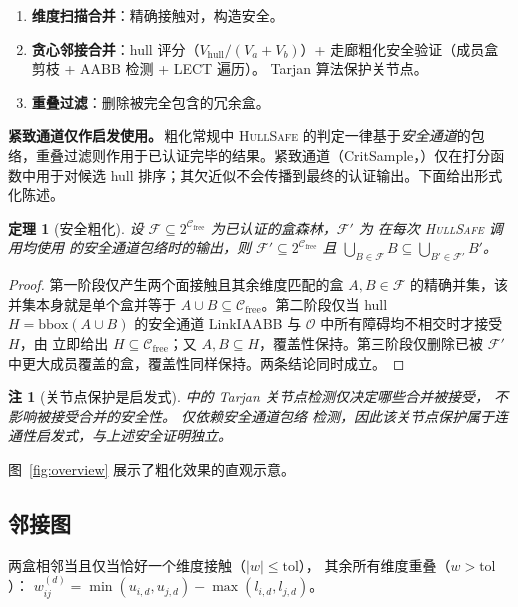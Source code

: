 \documentclass[journal]{IEEEtran}
\newtheorem{theorem}{定理}
\newtheorem{remark}{注}
\newcommand{\Cfree}{\mathcal{C}_{\mathrm{free}}}
\newcommand{\calO}{\mathcal{O}}
\begin{document}
\begin{enumerate}[nosep]
  \item \textbf{维度扫描合并}：精确接触对，构造安全。
  \item \textbf{贪心邻接合并}：hull 评分（$V_\text{hull}/(V_a+V_b)$）+
    走廊粗化安全验证（成员盒剪枝 + AABB 检测 + LECT 遍历）。
    Tarjan 算法保护关节点。
  \item \textbf{重叠过滤}：删除被完全包含的冗余盒。
\end{enumerate}

\textbf{紧致通道仅作启发使用。}\,粗化常规中 \textsc{HullSafe} 的判定一律基于\emph{安全通道}的包络，重叠过滤则作用于已认证完毕的结果。紧致通道（CritSample，）仅在打分函数中用于对候选 hull 排序；其欠近似不会传播到最终的认证输出。下面给出形式化陈述。

\begin{theorem}[安全粗化]\label{thm:coarsen_safe}
设 $\mathcal{F}\subseteq 2^{\Cfree}$ 为已认证的盒森林，$\mathcal{F}'$ 为  在每次 \textsc{HullSafe} 调用均使用  的安全通道包络时的输出，则 $\mathcal{F}'\subseteq 2^{\Cfree}$ 且 $\bigcup_{B\in\mathcal{F}}B \subseteq \bigcup_{B'\in\mathcal{F}'}B'$。
\end{theorem}

\begin{proof}
第一阶段仅产生两个面接触且其余维度匹配的盒 $A,B\in\mathcal{F}$ 的精确并集，该并集本身就是单个盒并等于 $A\cup B\subseteq\Cfree$。第二阶段仅当 hull $H=\mathrm{bbox}(A\cup B)$ 的安全通道 LinkIAABB 与 $\calO$ 中所有障碍均不相交时才接受 $H$，由  立即给出 $H\subseteq\Cfree$；又 $A,B\subseteq H$，覆盖性保持。第三阶段仅删除已被 $\mathcal{F}'$ 中更大成员覆盖的盒，覆盖性同样保持。两条结论同时成立。
\end{proof}

\begin{remark}[关节点保护是启发式]\label{rem:tarjan_heuristic}
 中的 Tarjan 关节点检测仅决定\emph{哪些}合并被接受，
不影响被接受合并的安全性。 仅依赖安全通道包络
检测，因此该关节点保护属于连通性启发式，与上述安全证明独立。
\end{remark}

图~\ref{fig:overview} 展示了粗化效果的直观示意。

\subsection{邻接图}

两盒相邻当且仅当恰好一个维度接触（$|w| \leq \text{tol}$），
其余所有维度重叠（$w > \text{tol}$）：
$w_{ij}^{(d)} = \min(u_{i,d}, u_{j,d}) - \max(l_{i,d}, l_{j,d})$。
\end{document}
